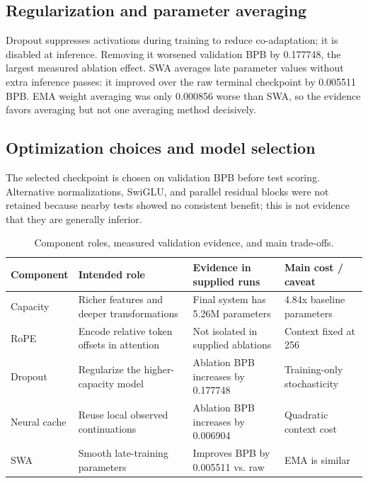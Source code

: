 \documentclass[11pt]{article}
\begin{document}
\subsection{Regularization and parameter averaging}
Dropout suppresses activations during training to reduce co-adaptation; it is disabled at inference. Removing it worsened validation BPB by 0.177748, the largest measured ablation effect. SWA averages late parameter values without extra inference passes: it improved over the raw terminal checkpoint by 0.005511 BPB. EMA weight averaging \cite{tarvainen2017mean} was only 0.000856 worse than SWA, so the evidence favors averaging but not one averaging method decisively.

\subsection{Optimization choices and model selection}
The selected checkpoint is chosen on validation BPB before test scoring. Alternative normalizations, SwiGLU, and parallel residual blocks were not retained because nearby tests showed no consistent benefit; this is not evidence that they are generally inferior.

\begin{table}[ht]
\centering
\small
\caption{Component roles, measured validation evidence, and main trade-offs.}
\label{tab:effects}
\begin{tabularx}{\linewidth}{@{}>{\raggedright\arraybackslash}p{1.05in}>{\raggedright\arraybackslash}X>{\raggedright\arraybackslash}p{1.35in}>{\raggedright\arraybackslash}p{1.35in}@{}}
\toprule
Component & Intended role & Evidence in supplied runs & Main cost / caveat \\
\midrule
Capacity & Richer features and deeper transformations & Final system has 5.26M parameters & 4.84x baseline parameters \\
RoPE & Encode relative token offsets in attention & Not isolated in supplied ablations & Context fixed at 256 \\
Dropout & Regularize the higher-capacity model & Ablation BPB increases by 0.177748 & Training-only stochasticity \\
Neural cache & Reuse local observed continuations & Ablation BPB increases by 0.006904 & Quadratic context cost \\
SWA & Smooth late-training parameters & Improves BPB by 0.005511 vs. raw & EMA is similar \\
\bottomrule
\end{tabularx}
\end{table}
\end{document}
